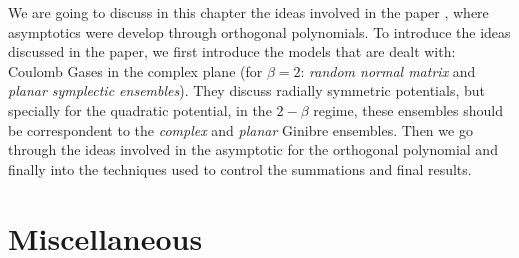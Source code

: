 \documentclass[]{report}
\numberwithin{equation}{section} %
\begin{document}
We are going to discuss in this chapter the ideas involved in the paper \cite{Byun_2023}, where asymptotics were develop through orthogonal polynomials. To introduce the ideas discussed in the paper, we first introduce the models that are dealt with: Coulomb Gases in the complex plane (for $\beta = 2$: \textit{random normal matrix} and \textit{planar symplectic ensembles}). They discuss radially symmetric potentials, but specially for the quadratic potential, in the $2-\beta$ regime, these ensembles should be correspondent to the \textit{complex} and \textit{planar} Ginibre ensembles. Then we go through the ideas involved in the asymptotic for the orthogonal polynomial and finally into the techniques used to control the summations and final results.










\chapter{Miscellaneous}



 


{}

\end{document}
